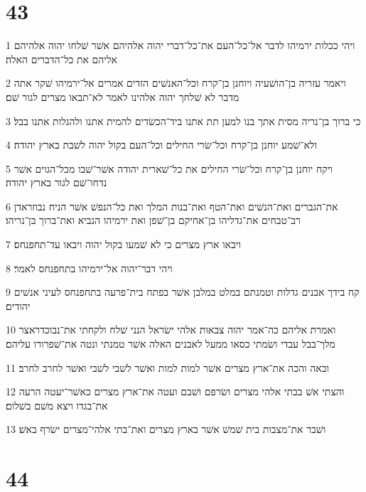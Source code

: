 \chapter{43}

\par 1 ויהי ככלות ירמיהו לדבר אל־כל־העם את־כל־דברי יהוה אלהיהם אשׁר שׁלחו יהוה אלהיהם אליהם את כל־הדברים האלה׃
\par 2 ויאמר עזריה בן־הושׁעיה ויוחנן בן־קרח וכל־האנשׁים הזדים אמרים אל־ירמיהו שׁקר אתה מדבר לא שׁלחך יהוה אלהינו לאמר לא־תבאו מצרים לגור שׁם׃
\par 3 כי ברוך בן־נריה מסית אתך בנו למען תת אתנו ביד־הכשׂדים להמית אתנו ולהגלות אתנו בבל׃
\par 4 ולא־שׁמע יוחנן בן־קרח וכל־שׂרי החילים וכל־העם בקול יהוה לשׁבת בארץ יהודה׃
\par 5 ויקח יוחנן בן־קרח וכל־שׂרי החילים את כל־שׁארית יהודה אשׁר־שׁבו מכל־הגוים אשׁר נדחו־שׁם לגור בארץ יהודה׃
\par 6 את־הגברים ואת־הנשׁים ואת־הטף ואת־בנות המלך ואת כל־הנפשׁ אשׁר הניח נבוזראדן רב־טבחים את־גדליהו בן־אחיקם בן־שׁפן ואת ירמיהו הנביא ואת־ברוך בן־נריהו׃
\par 7 ויבאו ארץ מצרים כי לא שׁמעו בקול יהוה ויבאו עד־תחפנחס׃
\par 8 ויהי דבר־יהוה אל־ירמיהו בתחפנחס לאמר׃
\par 9 קח בידך אבנים גדלות וטמנתם במלט במלבן אשׁר בפתח בית־פרעה בתחפנחס לעיני אנשׁים יהודים׃
\par 10 ואמרת אליהם כה־אמר יהוה צבאות אלהי ישׂראל הנני שׁלח ולקחתי את־נבוכדראצר מלך־בבל עבדי ושׂמתי כסאו ממעל לאבנים האלה אשׁר טמנתי ונטה את־שׁפרורו עליהם׃
\par 11 ובאה והכה את־ארץ מצרים אשׁר למות למות ואשׁר לשׁבי לשׁבי ואשׁר לחרב לחרב׃
\par 12 והצתי אשׁ בבתי אלהי מצרים ושׂרפם ושׁבם ועטה את־ארץ מצרים כאשׁר־יעטה הרעה את־בגדו ויצא משׁם בשׁלום׃
\par 13 ושׁבר את־מצבות בית שׁמשׁ אשׁר בארץ מצרים ואת־בתי אלהי־מצרים ישׂרף באשׁ׃

\chapter{44}

